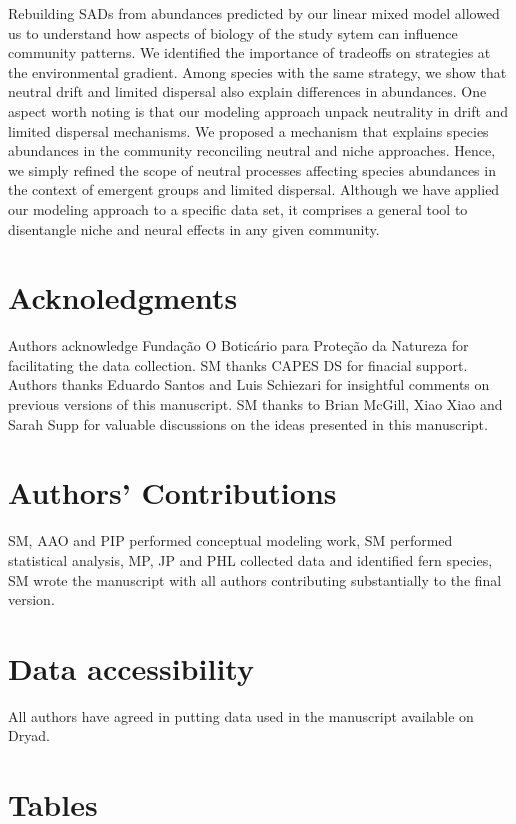 \documentclass[12pt]{article}
\begin{document}
Rebuilding SADs from abundances predicted by our linear mixed model  
allowed us to understand how aspects of biology of the study sytem can influence community
patterns. We %
identified the importance of tradeoffs on strategies at the environmental gradient. Among species with the
same strategy, we show that
neutral drift and limited dispersal also explain differences in
abundances.  
One aspect worth noting is
that our modeling approach unpack neutrality in drift and limited
dispersal mechanisms. 
We proposed a mechanism that explains species
abundances in the community reconciling neutral and niche
approaches. Hence, we simply refined the scope of neutral processes
affecting species abundances in the context of emergent groups and
limited dispersal. Although we have applied our modeling approach to a specific data set, it comprises a general tool to disentangle niche and neural effects in any given community. 

\section*{Acknoledgments} 
Authors acknowledge Fundação O Boticário para Proteção da Natureza for facilitating the data collection. SM thanks CAPES DS for finacial support. Authors thanks Eduardo Santos and Luis Schiezari for insightful comments on previous versions of this manuscript. SM thanks to Brian McGill, Xiao Xiao and Sarah Supp for valuable discussions on the ideas presented in this manuscript. 

\section*{Authors' Contributions} 
SM, AAO and PIP performed conceptual modeling work, SM performed statistical analysis, MP, JP and PHL collected data and identified fern species, SM wrote the manuscript with all authors contributing substantially to the final version.

\section*{Data accessibility} 
All authors have agreed in putting data used in the manuscript available on Dryad.




\newpage 


\section*{Tables}
\end{document}
